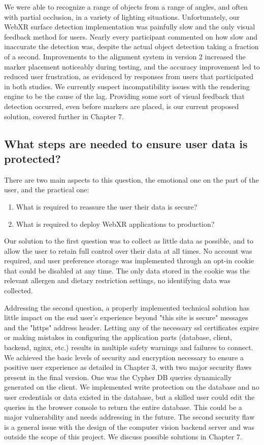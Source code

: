 \documentclass[thesis]{fputhesis}
\begin{document}
\begin{body}
We were able to recognize a range of objects from a range of angles, and often with partial occlusion, in a variety of lighting situations. Unfortunately, our WebXR surface detection implementation was painfully slow and the only visual feedback method for users. Nearly every participant commented on how slow and inaccurate the detection was, despite the actual object detection taking a fraction of a second. Improvements to the alignment system in version 2 increased the marker placement noticeably during testing, and the accuracy improvement led to reduced user frustration, as evidenced by responses from users that participated in both studies. We currently suspect incompatibility issues with the rendering engine to be the cause of the lag. Providing some sort of visual feedback that detection occurred, even before markers are placed, is our current proposed solution, covered further in Chapter 7.

\subsection{What steps are needed to ensure user data is protected?}
There are two main aspects to this question, the emotional one on the part of the user, and the practical one: 
\begin{enumerate}
    \item What is required to reassure the user their data is secure?
    \item What is required to deploy WebXR applications to production?
\end{enumerate}
Our solution to the first question was to collect as little data as possible, and to allow the user to retain full control over their data at all times. No account was required, and user preference storage was implemented through an opt-in cookie that could be disabled at any time. The only data stored in the cookie was the relevant allergen and dietary restriction settings, no identifying data was collected. 

Addressing the second question, a properly implemented technical solution has little impact on the end user's experience beyond "this site is secure" messages and the "https" address header. Letting any of the necessary \acrshort{ssl} certificates expire or making mistakes in configuring the application parts (database, client, backend, nginx, etc.) results in multiple safety warnings and failures to connect. 
We achieved the basic levels of security and encryption necessary to ensure a positive user experience as detailed in Chapter 3, with two major security flaws present in the final version. 
One was the Cypher DB queries dynamically generated on the client. We implemented write protection on the database and no user credentials or data existed in the database, but a skilled user could edit the queries in the browser console to return the entire database. This could be a major vulnerability and needs addressing in the future. 
The second security flaw is a general issue with the design of the computer vision backend server and was outside the scope of this project. We discuss possible solutions in Chapter 7.


\end{body}
\end{document}
